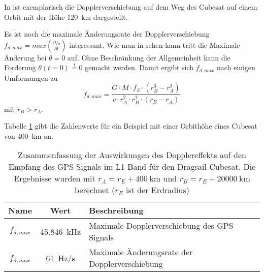 
In  ist exemplarisch die Dopplerverschiebung auf dem Weg des Cubesat auf einem Orbit mit der Höhe \SI{120}{\km} dargestellt. 


Es ist noch die maximale Änderungsrate der Dopplerverschiebung  $\dot f_{d,max}=max\left(\frac{\partial f_d}{\partial t}\right)$ interessant.  Wie man in  sehen kann tritt die Maximale Änderung bei $\theta=0$ auf. Ohne Beschränkung der Allgemeinheit kann die Forderung $\theta(t=0)\overset{!}{=}0$ gemacht werden. Damit ergibt sich $\dot f_{d,max}$ nach einigen Umformungen zu
\begin{equation}
	\dot f_{d,max}= \frac{G \cdot  M \cdot  f_S \cdot  (r_B^3-r_A^3)}{c \cdot  r_A^2 \cdot  r_B^2\cdot  (r_B-r_A)}
\end{equation}
mit $r_B>r_A$.

Tabelle \ref{TabDoppler} gibt die Zahlenwerte für ein Beispiel mit einer Orbithöhe eines Cubesat von \SI{400}{km} an.

\begin{table}[htbp]
    \ttabbox
    {
        \caption{Zusammenfassung der Auswirkungen des Dopplereffekts auf den Empfang des GPS Signals im L1 Band für den Dragsail Cubesat. Die Ergebnisse wurden mit $r_A=r_E+\SI{400}{\km}$ und $r_B=r_E+\SI{20000}{\km}$ berechnet ($r_E$ ist der Erdradius)}
        \label{TabDoppler}
    }
    {
    \begin{tabular}{c c p{5.5cm}}
        \toprule
        Name             & Wert & Beschreibung \\
        \midrule
        $f_{d,max}$ & \SI{45.846}{\kHz} &  Maximale Dopplerverschiebung des GPS Signals\\
        $\dot f_{d,max}$ & \SI{61}{\Hz/\s}& Maximale Änderungsrate der Dopplerverschiebung \\
        \bottomrule
    \end{tabular}
}
\end{table}
